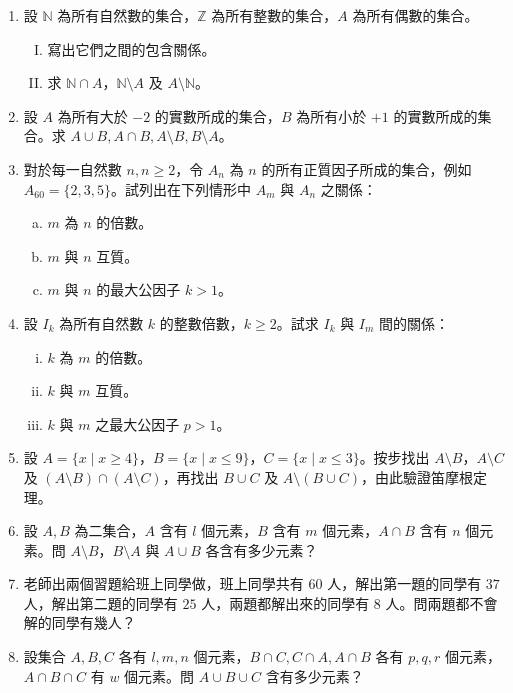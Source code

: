 \begin{enumerate}[1., leftmargin=2em]
  \item 設 $\mathbb{N}$ 為所有自然數的集合，$\mathbb{Z}$ 為所有整數的集合，$A$ 為所有偶數的集合。
  \begin{enumerate}[(I)]
    \item 寫出它們之間的包含關係。
    \item 求 $\mathbb{N} \cap A$，$\mathbb{N} \setminus A$ 及 $A \setminus \mathbb{N}$。
  \end{enumerate}
  \item 設 $A$ 為所有大於 $-2$ 的實數所成的集合，$B$ 為所有小於 $+1$ 的實數所成的集合。求 $A \cup B, A \cap B, A \setminus B, B \setminus A$。
  \item 對於每一自然數 $n, n \ge 2$，令 $A_n$ 為 $n$ 的所有正質因子所成的集合，例如 $A_{60} = \{2, 3, 5\}$。試列出在下列情形中 $A_m$ 與 $A_n$ 之關係：
  \begin{enumerate}[(a)]
    \item $m$ 為 $n$ 的倍數。
    \item $m$ 與 $n$ 互質。
    \item $m$ 與 $n$ 的最大公因子 $k > 1$。
  \end{enumerate}
  \item 設 $I_k$ 為所有自然數 $k$ 的整數倍數，$k \ge 2$。試求 $I_k$ 與 $I_m$ 間的關係：
  \begin{enumerate}[(i)]
    \item $k$ 為 $m$ 的倍數。
    \item $k$ 與 $m$ 互質。
    \item $k$ 與 $m$ 之最大公因子 $p > 1$。
  \end{enumerate}
  \item 設 $A = \{x \mid x \ge 4\}$，$B = \{x \mid x \le 9\}$，$C = \{x \mid x \le 3\}$。按步找出 $A \setminus B$，$A \setminus C$ 及 $(A \setminus B) \cap (A \setminus C)$，再找出 $B \cup C$ 及 $A \setminus (B \cup C)$，由此驗證笛摩根定理。
  \item 設 $A, B$ 為二集合，$A$ 含有 $l$ 個元素，$B$ 含有 $m$ 個元素，$A \cap B$ 含有 $n$ 個元素。問 $A \setminus B$，$B \setminus A$ 與 $A \cup B$ 各含有多少元素？
  \item 老師出兩個習題給班上同學做，班上同學共有 $60$ 人，解出第一題的同學有 $37$ 人，解出第二題的同學有 $25$ 人，兩題都解出來的同學有 $8$ 人。問兩題都不會解的同學有幾人？
  \item 設集合 $A, B, C$ 各有 $l, m, n$ 個元素，$B \cap C, C \cap A, A \cap B$ 各有 $p, q, r$ 個元素，$A \cap B \cap C$ 有 $w$ 個元素。問 $A \cup B \cup C$ 含有多少元素？

\end{enumerate}
